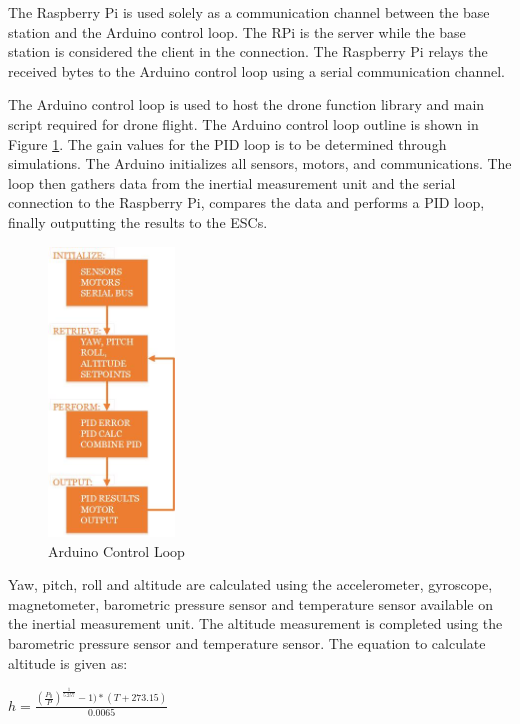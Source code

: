 The Raspberry Pi is used solely as a communication channel between the base station and the Arduino control loop. The RPi is the server while the base station is considered the client in the connection. The Raspberry Pi relays the received bytes to the Arduino control loop using a serial communication channel. 

The Arduino control loop is used to host the drone function library and main script required for drone flight. The Arduino control loop outline is shown in Figure \ref{fig:ctl_loop}. The gain values for the PID loop is to be determined through simulations. The Arduino initializes all sensors, motors, and communications. The loop then gathers data from the inertial measurement unit and the serial connection to the Raspberry Pi, compares the data and performs a PID loop, finally outputting the results to the ESCs.

\begin{figure}[H]
	\centering
	\includegraphics[width=0.3\textwidth]{control-loop.jpg}
	\caption{Arduino Control Loop}
	\label{fig:ctl_loop}	
\end{figure}

Yaw, pitch, roll and altitude are calculated using the accelerometer, gyroscope, magnetometer, barometric pressure sensor and temperature sensor available on the inertial measurement unit. The altitude measurement is completed using the barometric pressure sensor and temperature sensor. The equation to calculate altitude is given as: 

\vspace*{0.2in}
$h=\frac{(\frac{P_{0}}{P})^\frac{1}{5.257}-1)*(T+273.15)}{0.0065}$
\vspace*{0.2in}

